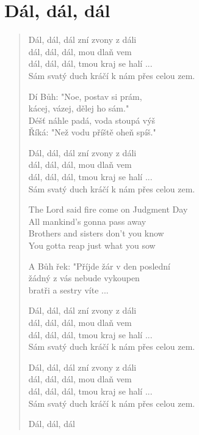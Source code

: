 \section{Dál, dál, dál}

\begin{verse}
Dál, dál, dál zní zvony z dáli \\
dál, dál, dál, mou dlaň vem \\
dál, dál, dál, tmou kraj se halí ... \\
Sám svatý duch kráčí k nám přes celou zem.

Dí Bůh: "Noe, postav si prám, \\
kácej, vázej, dělej ho sám." \\
Déšť náhle padá, voda stoupá výš \\
Říká: "Než vodu příště oheň spíš."

Dál, dál, dál zní zvony z dáli \\
dál, dál, dál, mou dlaň vem \\
dál, dál, dál, tmou kraj se halí ... \\
Sám svatý duch kráčí k nám přes celou zem.

The Lord said fire come on Judgment Day \\
All mankind's gonna pass away \\
Brothers and sisters don't you know \\
You gotta reap just what you sow

A Bůh řek: "Příjde žár v den poslední\\
žádný z vás nebude vykoupen \\
bratři a sestry víte ...


Dál, dál, dál zní zvony z dáli \\
dál, dál, dál, mou dlaň vem \\
dál, dál, dál, tmou kraj se halí ... \\
Sám svatý duch kráčí k nám přes celou zem.

Dál, dál, dál zní zvony z dáli \\
dál, dál, dál, mou dlaň vem \\
dál, dál, dál, tmou kraj se halí ... \\
Sám svatý duch kráčí k nám přes celou zem.

Dál, dál, dál
\end{verse}
